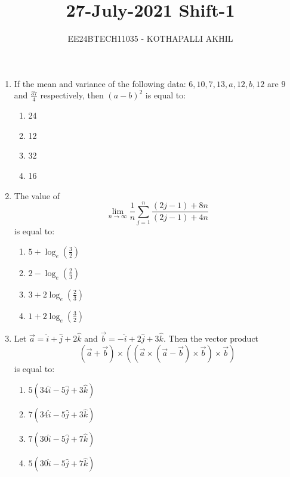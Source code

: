 \documentclass[journal]{IEEEtran}
\numberwithin{equation}{enumi}
\numberwithin{figure}{enumi}
\begin{document}


\title{27-July-2021 Shift-1}
\author{EE24BTECH11035 - KOTHAPALLI AKHIL}
{\let\newpage\relax\maketitle}


\begin{enumerate}

\item
If the mean and variance of the following data:  
$ 6, 10, 7, 13, a, 12, b, 12 $  
are $ 9 $ and $ \frac{37}{4} $ respectively, then $ (a - b)^2 $ is equal to:
\begin{enumerate}
    \item 24 
    \item 12
    \item 32
    \item 16
\end{enumerate}

\item
The value of  
\begin{equation}
\lim_{n \to \infty} \frac{1}{n} \sum_{j=1}^{n} \frac{(2j - 1) + 8n}{(2j-1)+4n}
\end{equation}
is equal to:
\begin{enumerate}
    \item $5 + \log_e \left(\frac{3}{2}\right)$
    \item $2 - \log_e \left(\frac{2}{3}\right)$
    \item $3 + 2 \log_e \left(\frac{2}{3}\right)$
    \item $1 + 2 \log_e \left(\frac{3}{2}\right)$
\end{enumerate}

\item
Let $ \vec{a} = \hat{i} + \hat{j} + 2\hat{k} $ and $ \vec{b} = -\hat{i} + 2\hat{j} + 3\hat{k} $. Then the vector product
\begin{equation}
    (\vec{a} + \vec{b}) \times \left( \left( \vec{a}\times(\vec{a} - \vec{b}) \times \vec{b} \right) \times \vec{b} \right)
\end{equation}
is equal to:
\begin{enumerate}
    \item $5(34\hat{i} - 5\hat{j} + 3\hat{k})$
    \item $7(34\hat{i} - 5\hat{j} + 3\hat{k})$
    \item $7(30\hat{i} - 5\hat{j} + 7\hat{k})$
    \item $5(30\hat{i} - 5\hat{j} + 7\hat{k})$
\end{enumerate}


\end{enumerate}
\end{document}

